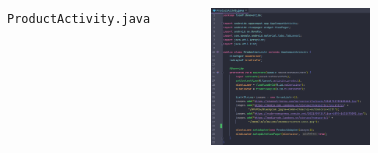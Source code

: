 \documentclass{beamer}
\begin{document}
\begin{frame}
\begin{columns}
\begin{figure}
        \end{figure}
        \indent \texttt{ProductActivity.java}
        \begin{figure}
            \centering
            \includegraphics[width=\textwidth]{images/39.png}
        \end{figure}
    \end{columns}
\end{frame}
\end{document}
